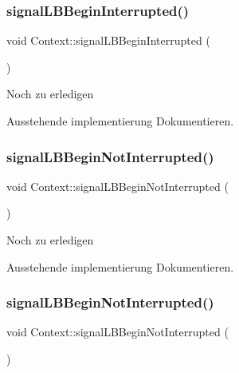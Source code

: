 \subsubsection{\texorpdfstring{signal\+L\+B\+Begin\+Interrupted()}{signalLBBeginInterrupted()}\hspace{0.1cm}{\footnotesize\ttfamily [2/2]}}
{\footnotesize\ttfamily void Context\+::signal\+L\+B\+Begin\+Interrupted (\begin{DoxyParamCaption}{ }\end{DoxyParamCaption})}

\begin{DoxyRefDesc}{Noch zu erledigen}
\item[\hyperlink{todo__todo000001}{Noch zu erledigen}]Ausstehende implementierung Dokumentieren. \end{DoxyRefDesc}
\hypertarget{class_context_a9528945480d5072126031a6ce0d20b99}{}\label{class_context_a9528945480d5072126031a6ce0d20b99} 
\subsubsection{\texorpdfstring{signal\+L\+B\+Begin\+Not\+Interrupted()}{signalLBBeginNotInterrupted()}\hspace{0.1cm}{\footnotesize\ttfamily [1/2]}}
{\footnotesize\ttfamily void Context\+::signal\+L\+B\+Begin\+Not\+Interrupted (\begin{DoxyParamCaption}{ }\end{DoxyParamCaption})}

\begin{DoxyRefDesc}{Noch zu erledigen}
\item[\hyperlink{todo__todo000005}{Noch zu erledigen}]Ausstehende implementierung Dokumentieren. \end{DoxyRefDesc}
\hypertarget{class_context_a9528945480d5072126031a6ce0d20b99}{}\label{class_context_a9528945480d5072126031a6ce0d20b99} 
\subsubsection{\texorpdfstring{signal\+L\+B\+Begin\+Not\+Interrupted()}{signalLBBeginNotInterrupted()}\hspace{0.1cm}{\footnotesize\ttfamily [2/2]}}
{\footnotesize\ttfamily void Context\+::signal\+L\+B\+Begin\+Not\+Interrupted (\begin{DoxyParamCaption}{ }\end{DoxyParamCaption})}

